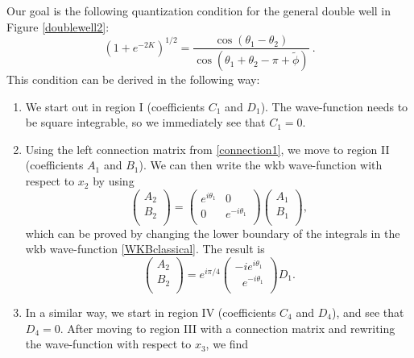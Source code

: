 \documentclass[12pt]{article}
\begin{document}
 Our goal is the following quantization condition for the general double well in Figure \ref{doublewell2}:
\begin{equation}
\left(1+e^{-2K}\right)^{1/2}=\frac{\cos(\theta_1-\theta_2)}{\cos(\theta_1+\theta_2-\pi+\tilde{\phi})}\ .
\label{AsymetricQuantization}
\end{equation}
This condition can be derived in the following way:
\begin{enumerate}
\item We start out in region I (coefficients $C_1$ and $D_1$).
The wave-function needs to be square integrable, so we immediately see that $C_1=0$.
\item Using the left connection matrix from \eqref{connection1}, we move to region II (coefficients $A_1$ and $B_1$).
We can then write the {\sc wkb} wave-function with respect to $x_2$ by using
\begin{equation}
\left( \begin{array}{c}
A_2\\
B_2\\
\end{array} \right)=
\left( \begin{array}{cc}
e^{i\theta_1} & 0\\
0 & e^{-i\theta_1}\\
\end{array} \right)
\left( \begin{array}{c}
A_1\\
B_1\\\end{array} \right),
\end{equation}
which can be proved by changing the lower boundary of the integrals in the {\sc wkb} wave-function \eqref{WKBclassical}.
The result is 
\begin{equation}
\left( \begin{array}{c}
A_2\\
B_2\\
\end{array} \right)=e^{i\pi/4}
\left( \begin{array}{c}
-i e^{i\theta_1}\\
\ \ \ e^{-i\theta_1}\\
\end{array} \right)D_1.
\label{aaa}
\end{equation}
\item In a similar way, we start in region IV (coefficients $C_4$ and $D_4$), and see that $D_4=0$.
After moving to region III with a connection matrix and rewriting the wave-function with respect to $x_3$, we find

\end{enumerate}
\end{document}
